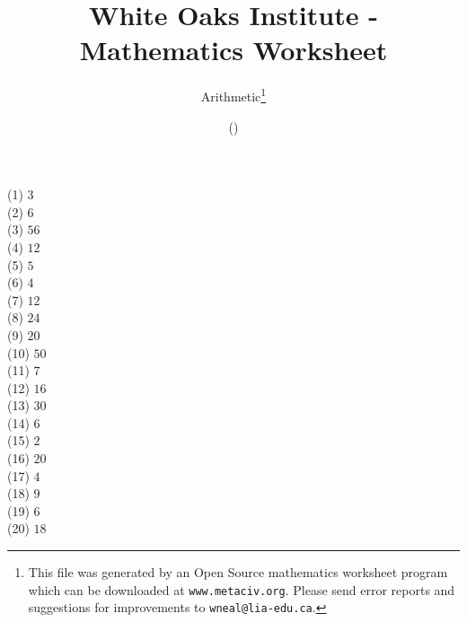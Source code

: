 \documentclass[letter]{article}
\begin{document}
\title{White Oaks Institute - Mathematics Worksheet}
\author{Arithmetic\thanks{This file was generated by an \textsf{Open Source} mathematics worksheet program which can be downloaded at \texttt{www.metaciv.org}. Please send error reports and suggestions for improvements to \texttt{wneal@lia-edu.ca}.}}
\date{\XCfileversion{} (\XCfiledate)}
\maketitle
\setlength{\parskip}{12mm plus 4mm minus 4mm}\setlength{\parindent}{0cm}\begin{multicols}{2}(1) $3$\\(2) $6$\\(3) $56$\\(4) $12$\\(5) $5$\\(6) $4$\\(7) $12$\\(8) $24$\\(9) $20$\\(10) $50$\\(11) $7$\\(12) $16$\\(13) $30$\\(14) $6$\\(15) $2$\\(16) $20$\\(17) $4$\\(18) $9$\\(19) $6$\\(20) $18$\\\end{multicols}
\end{document}
